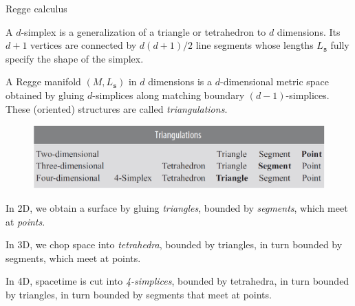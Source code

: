 \documentclass[12pt,titlepage]{article}
\begin{document}
\begin{frame}{Regge calculus}
    \begin{list}{\,}{\leftmargin=1em \itemindent=0em}
        \item A $d$-simplex is a generalization of a triangle or tetrahedron to $d$ dimensions. Its $d+1$ vertices are connected by $d(d+1)/2$ line segments whose lengths $L_\mathtt{s}$ fully specify the shape of the simplex.
        \item A Regge manifold $(M,L_\mathtt{s})$ in $d$ dimensions is a $d$-dimensional metric space obtained by gluing $d$-simplices along matching boundary $(d-1)$-simplices. These (oriented) structures are called \textit{triangulations}.\\\noindent\FloatBarrier
        \begin{figure}[!ht]
            \begin{minipage}{\linewidth}
                \centering\includegraphics[width=0.8\linewidth]{4.2.png}
            \end{minipage}
        \end{figure}\FloatBarrier
        \item In 2D, we obtain a surface by gluing \textit{triangles}, bounded by \textit{segments}, which meet at \textit{points}.
        \item In 3D, we chop space into \textit{tetrahedra}, bounded by triangles, in turn bounded by segments, which meet at points.
        \item In 4D, spacetime is cut into \textit{4-simplices}, bounded by tetrahedra, in turn bounded by triangles, in turn bounded by segments that meet at points.
    \end{list}
\end{frame}
\end{document}
